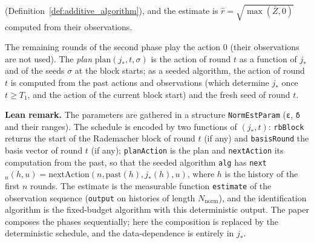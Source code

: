 \begin{definition}
\begin{enumerate}
        (Definition~\ref{def:additive_algorithm}), and the estimate is
        $\hat r = \sqrt{\max(\bar Z, 0)}$ computed from their observations.
\end{enumerate}
The remaining rounds of the second phase play the action $0$ (their observations are not
used). The \emph{plan} $\mathrm{plan}(j_*, t, \sigma)$ is the action of round $t$ as a
function of $j_*$ and of the seeds $\sigma$ at the block starts; as a seeded algorithm, the
action of round $t$ is computed from the past actions and observations (which determine
$j_*$ once $t \ge T_1$, and the action of the current block start) and the fresh seed of
round $t$.
\end{definition}

\textbf{Lean remark.} The parameters are gathered in a structure \texttt{NormEstParam}
(\texttt{ε}, \texttt{δ} and their ranges). The schedule is encoded by two functions of
$(j_*, t)$: \texttt{rbBlock} returns the start of the Rademacher block of round $t$ (if any)
and \texttt{basisRound} the basis vector of round $t$ (if any); \texttt{planAction} is the
plan and \texttt{nextAction} its computation from the past, so that the seeded algorithm
\texttt{alg} has \texttt{next}$_n(h, u) = \mathrm{nextAction}(n, \mathrm{past}(h), j_*(h), u)$,
where $h$ is the history of the first $n$ rounds.
The estimate is the measurable function \texttt{estimate} of the observation sequence
(\texttt{output} on histories of length $N_{\mathrm{norm}}$), and the identification
algorithm is the fixed-budget algorithm with this deterministic output. The paper composes
the phases sequentially; here the composition is replaced by the deterministic schedule,
and the data-dependence is entirely in $j_*$.

